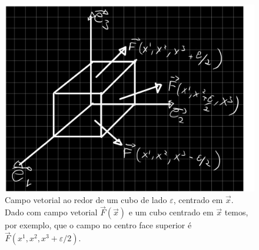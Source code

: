 \begin{figure}
	\centering \includegraphics[scale=0.5]{Div.pdf} \caption{Campo vetorial ao redor
		de um cubo de lado $\varepsilon$, centrado em $\vec{x}$. Dado com campo vetorial
		$\vec{F}(\vec{x})$ e um cubo centrado em $\vec{x}$ temos, por exemplo, que o
		campo no centro face superior é $\vec{F}(x^1,x^2,x^3+\varepsilon/2)$.
		\label{fig:div}}
\end{figure}

